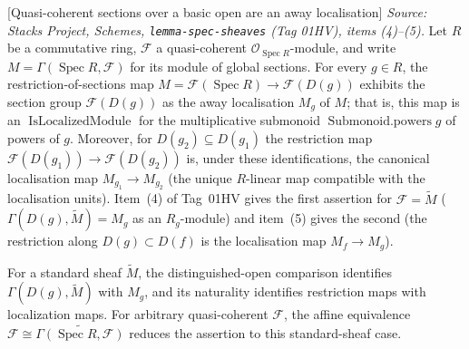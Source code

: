 \begin{definition}

[Quasi-coherent sections over a basic open are an away localisation]
  \label{def:qcoh_sections_localized}
  \textit{Source: Stacks Project, Schemes, \texttt{lemma-spec-sheaves} (Tag 01HV),
  items (4)--(5).}
  Let \(R\) be a commutative ring, \(\mathcal{F}\) a quasi-coherent
  \(\mathcal{O}_{\operatorname{Spec} R}\)-module, and write
  \(M = \Gamma(\operatorname{Spec} R, \mathcal{F})\) for its module of global
  sections. For every \(g \in R\), the restriction-of-sections map
  \(M = \mathcal{F}(\operatorname{Spec} R) \to \mathcal{F}(D(g))\) exhibits the
  section group \(\mathcal{F}(D(g))\) as the away localisation \(M_g\) of \(M\); that
  is, this map is an \(\operatorname{IsLocalizedModule}\) for the multiplicative
  submonoid \(\operatorname{Submonoid.powers} g\) of powers of \(g\). Moreover, for
  \(D(g_2) \subseteq D(g_1)\) the restriction map
  \(\mathcal{F}(D(g_1)) \to \mathcal{F}(D(g_2))\) is, under these identifications, the
  canonical localisation map \(M_{g_1} \to M_{g_2}\) (the unique \(R\)-linear map
  compatible with the localisation units). Item~(4) of Tag~01HV gives the first
  assertion for \(\mathcal{F} = \widetilde{M}\) (\(\Gamma(D(g), \widetilde{M}) = M_g\)
  as an \(R_g\)-module) and item~(5) gives the second (the restriction along
  \(D(g) \subset D(f)\) is the localisation map \(M_f \to M_g\)).

  For a standard sheaf \(\widetilde M\), the distinguished-open comparison identifies
  \(\Gamma(D(g),\widetilde M)\) with \(M_g\), and its naturality identifies restriction
  maps with localization maps. For arbitrary quasi-coherent \(\mathcal F\), the affine
  equivalence
  \(\mathcal{F} \cong \widetilde{\Gamma(\operatorname{Spec} R,\mathcal{F})}\)
  reduces the assertion to this standard-sheaf case.


\end{definition}
